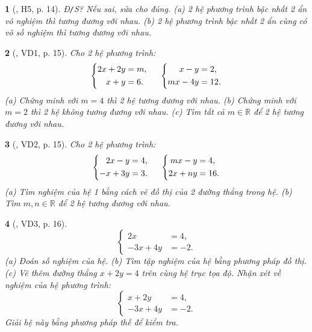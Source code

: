 \documentclass{article}
\newtheorem{baitoan}{}
\begin{document}
\begin{baitoan}[\cite{Binh_boi_duong_Toan_9_tap_2}, H5, p. 14]
	{\rm Đ{\tt/}S?} Nếu sai, sửa cho đúng. (a) 2 hệ phương trình bậc nhất 2 ẩn vô nghiệm thì tương đương với nhau. (b) 2 hệ phương trình bậc nhất 2 ẩn cùng có vô số nghiệm thì tương đương với nhau.
\end{baitoan}

\begin{baitoan}[\cite{Binh_boi_duong_Toan_9_tap_2}, VD1, p. 15]
	Cho 2 hệ phương trình:
	\begin{equation*}
		\left\{\begin{split}
			2x + 2y &= m,\\
			x + y &= 6.
		\end{split}\right.\hspace{5mm}
		\left\{\begin{split}
			x - y &= 2,\\
			mx - 4y &= 12.
		\end{split}\right.
	\end{equation*}
	(a) Chứng minh với $m = 4$ thì 2 hệ tương đương với nhau. (b) Chứng minh với $m = 2$ thì 2 hệ không tương đương với nhau. (c) Tìm tất cả $m\in\mathbb{R}$ để 2 hệ tương đương với nhau.
\end{baitoan}

\begin{baitoan}[\cite{Binh_boi_duong_Toan_9_tap_2}, VD2, p. 15]
	Cho 2 hệ phương trình:
	\begin{equation*}
		\left\{\begin{split}
			2x - y &= 4,\\
			-x + 3y &= 3.
		\end{split}\right.\hspace{5mm}
		\left\{\begin{split}
			mx - y &= 4,\\
			2x + ny &= 16.
		\end{split}\right.
	\end{equation*}
	(a) Tìm nghiệm của hệ 1 bằng cách vẽ đồ thị của 2 đường thẳng trong hệ. (b) Tìm $m,n\in\mathbb{R}$ để 2 hệ tương đương với nhau.
\end{baitoan}

\begin{baitoan}[\cite{Binh_boi_duong_Toan_9_tap_2}, VD3, p. 16]
	\begin{equation*}
		\left\{\begin{split}
			2x &= 4,\\
			-3x + 4y &= -2.
		\end{split}\right.
	\end{equation*}
	(a) Đoán số nghiệm của hệ. (b) Tìm tập nghiệm của hệ bằng phương pháp đồ thị. (c) Vẽ thêm đường thẳng $x + 2y = 4$ trên cùng hệ trục tọa độ. Nhận xét về nghiệm của hệ phương trình:
	\begin{equation*}
		\left\{\begin{split}
			x + 2y &= 4,\\
			-3x + 4y &= -2.
		\end{split}\right.
	\end{equation*}
	Giải hệ này bằng phương pháp thế để kiểm tra.
\end{baitoan}
\end{document}
